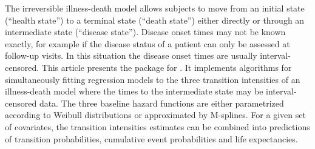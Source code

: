 The irreversible illness-death model allows subjects to move from an
initial state (``health state'') to a terminal state (``death state'')
either directly or through an intermediate state (``disease
state''). Disease onset times may not be known exactly, for example if
the disease status of a patient can only be assessed at follow-up
visits. In this situation the disease onset times are usually
interval-censored. This article presents the 
package for . It implements algorithms for simultaneously
fitting regression models to the three transition intensities of an
illness-death model where the times to the intermediate state may be
interval-censored data. The three baseline hazard functions are either
parametrized according to Weibull distributions or approximated by
M-splines. For a given set of covariates, the transition intensities estimates can
be combined into predictions of transition probabilities, cumulative event probabilities and
life expectancies.
